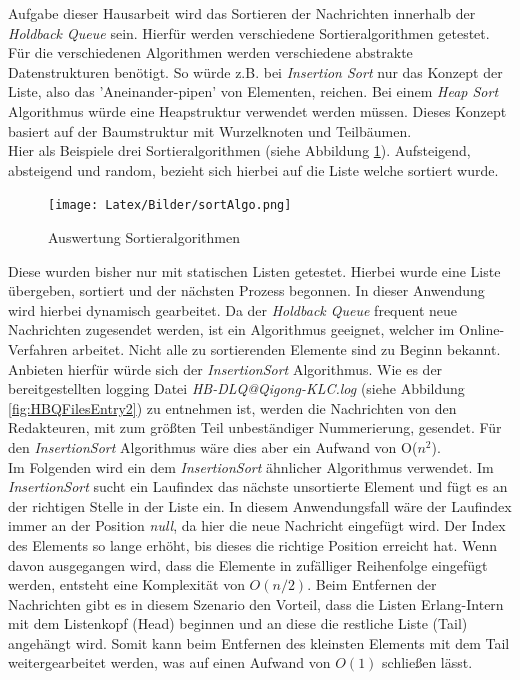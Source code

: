 Aufgabe dieser Hausarbeit wird das Sortieren der Nachrichten innerhalb der \textit{Holdback Queue} sein. Hierfür werden verschiedene Sortieralgorithmen getestet. Für die verschiedenen Algorithmen werden verschiedene abstrakte Datenstrukturen benötigt. So würde z.B. bei \textit{Insertion Sort} nur das Konzept der Liste, also das 'Aneinander-pipen' von Elementen, reichen. Bei einem \textit{Heap Sort} Algorithmus würde eine Heapstruktur verwendet werden müssen. Dieses Konzept basiert auf der Baumstruktur mit Wurzelknoten und Teilbäumen.\\
Hier als Beispiele drei Sortieralgorithmen (siehe Abbildung \ref{fig:sortAlgo}). Aufsteigend, absteigend und random, bezieht sich hierbei auf die Liste welche sortiert wurde.

\begin{figure}[htbp]
\begin{center}
\texttt{[image: Latex/Bilder/sortAlgo.png]}
\caption{\label{fig:sortAlgo} Auswertung Sortieralgorithmen \cite{sortAlgo}} 
\end{center}
\end{figure}

Diese wurden bisher nur mit statischen Listen getestet. Hierbei wurde eine Liste übergeben, sortiert und der nächsten Prozess begonnen. In dieser Anwendung wird hierbei dynamisch gearbeitet. Da der \textit{Holdback Queue} frequent neue Nachrichten zugesendet werden, ist ein Algorithmus geeignet, welcher im Online-Verfahren arbeitet. Nicht alle zu sortierenden Elemente sind zu Beginn bekannt. Anbieten hierfür würde sich der \textit{InsertionSort} Algorithmus. 
Wie es der bereitgestellten logging Datei \textit{HB-DLQ@Qigong-KLC.log} (siehe Abbildung \ref{fig:HBQFilesEntry2}) zu entnehmen ist, werden die Nachrichten von den Redakteuren, mit zum größten Teil unbeständiger Nummerierung, gesendet. Für den \textit{InsertionSort} Algorithmus wäre dies aber ein Aufwand von O($n^2$).\\ Im Folgenden wird ein dem \textit{InsertionSort} ähnlicher Algorithmus verwendet. Im \textit{InsertionSort} sucht ein Laufindex das nächste unsortierte Element und fügt es an der richtigen Stelle in der Liste ein. In diesem Anwendungsfall wäre der Laufindex immer an der Position \textit{null}, da hier die neue Nachricht eingefügt wird. Der Index des Elements so lange erhöht, bis dieses die richtige Position erreicht hat. Wenn davon ausgegangen wird, dass die Elemente in zufälliger Reihenfolge eingefügt werden, entsteht eine Komplexität von $O(n/2)$. Beim Entfernen der Nachrichten gibt es in diesem Szenario den Vorteil, dass die Listen Erlang-Intern mit dem Listenkopf (Head) beginnen und an diese die restliche Liste (Tail) angehängt wird. Somit kann beim Entfernen des kleinsten Elements mit dem Tail weitergearbeitet werden, was auf einen Aufwand von $O(1)$ schließen lässt.

